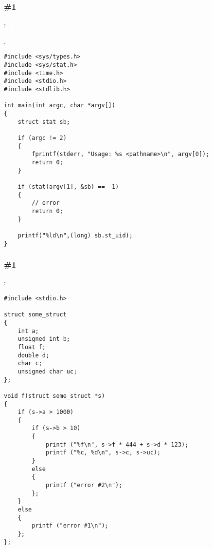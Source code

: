 \subsubsection{\Exercise \#1}
\label{exercise_solutions_struct_1}

\Exercise: .

.

\begin{lstlisting}
#include <sys/types.h>
#include <sys/stat.h>
#include <time.h>
#include <stdio.h>
#include <stdlib.h>

int main(int argc, char *argv[])
{
    struct stat sb;

    if (argc != 2) 
    {
        fprintf(stderr, "Usage: %s <pathname>\n", argv[0]);
        return 0;
    }

    if (stat(argv[1], &sb) == -1) 
    {
    	// error
        return 0;
    }

    printf("%ld\n",(long) sb.st_uid);
}
\end{lstlisting}

\subsubsection{\Exercise \#1}
\label{exercise_solutions_struct_2}

\Exercise: .


\begin{lstlisting}
#include <stdio.h>

struct some_struct
{
	int a;
	unsigned int b;
	float f;
	double d;
	char c;
	unsigned char uc;
};

void f(struct some_struct *s)
{
	if (s->a > 1000)
	{
		if (s->b > 10)
		{
			printf ("%f\n", s->f * 444 + s->d * 123);
			printf ("%c, %d\n", s->c, s->uc);
		}
		else
		{
			printf ("error #2\n");
		};
	}
	else
	{
		printf ("error #1\n");
	};
};
\end{lstlisting}

\subsection{}

